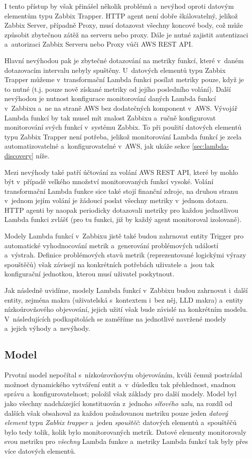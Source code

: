 \documentclass[czech, ing, kiv, he, iso690]{fasthesis}
\begin{document}
I tento přístup by však přinášel několik problémů a~nevýhod oproti datovým elementům typu Zabbix Trapper. HTTP agent není dobře škálovatelný, jelikož Zabbix Server, případně Proxy, musí dotazovat všechny koncové body, což může způsobit zbytečnou zátěž na serveru nebo proxy. Dále je nutné zajistit autentizaci a~autorizaci Zabbix Serveru nebo Proxy vůči AWS REST API. 

Hlavní nevýhodou pak je zbytečné dotazování na metriky funkcí, které v~daném dotazovacím intervalu nebyly spuštěny. U~datových elementů typu Zabbix Trapper můžeme v~transformační Lambda funkci posílat metriky pouze, když je to nutné (t.j. pouze nově získané metriky od jejího posledního volání). Další nevýhodou je nutnost konfigurace monitorování daných Lambda funkcí v~Zabbixu a~ne na straně AWS bez dodatečných komponent v~AWS. Vývojář Lambda funkcí by tak musel mít znalost Zabbixu a~ručně konfigurovat monitorování svých funkcí v~systému Zabbix. To při použití datových elementů typu Zabbix Trapper není potřeba, jelikož monitorování Lambda funkcí je zcela automatizovatelné a~konfigurovatelné v~AWS, jak ukáže sekce \ref{sec:lambda-discovery} níže.

Mezi nevýhody také patří účtování za volání AWS REST API, které by mohlo být v~případě velkého množství monitorovaných funkcí vysoké. Volání transformační Lambda funkce sice také stojí finanční zdroje, na druhou stranu v~jednom jejím volání je žádoucí poslat všechny metriky v~jednom dotazu. HTTP agenti by naopak periodicky dotazovali metriky pro každou jednotlivou Lambda funkci zvlášť (pro tu funkci, již by každý agent monitoroval izolovaně).

Modely Lambda funkcí v~Zabbixu jistě také budou zahrnovat entity Trigger pro automatické vyhodnocování metrik a~generování problémových událostí a~výstrah. Definice problémových stavů metrik (reprezentované logickými výrazy spouštěčů) však závisejí na konkrétních potřebách uživatele a~jsou tak konfigurační jednotkou, kterou musí uživatel poskytnout.

Jak následně uvidíme, modely Lambda funkcí v~Zabbixu budou zahrnovat i~další entity, zejména makra (uživatelská s~kontextem i~bez něj, LLD makra) a~entity nízkoúrovňového objevování, jejich užití však bude závislé na konkrétním modelu. V~následujících podkapitolách se zaměříme na jednotlivé navržené modely a~jejich výhody a~nevýhody.

\subsection{Model }
Prvotní model nepočítal s~nízkoúrovňovým objevováním, kvůli čemuž postrádal možnost dynamického vytváření entit a~v~důsledku tak přehlednost, snadnou správu a~konfigurovatelnost; položil však základy pro další modely. Model byl jako všechny nadcházející konstituován z~jednoho \emph{síťového uzlu}, na rozdíl od dalších však obsahoval za každou požadovanou metriku pouze jeden \emph{datový element} typu \emph{Zabbix trapper} a~jeden \emph{spouštěč}: datových elementů a~spouštěčů bylo tedy tolik, kolik bylo monitorovaných metrik. Datové elementy monitorovaly svou metriku pro \emph{všechny} Lambda funkce a~metriky Lambda funkcí tak byly  přes více datových elementů. 
\end{document}
